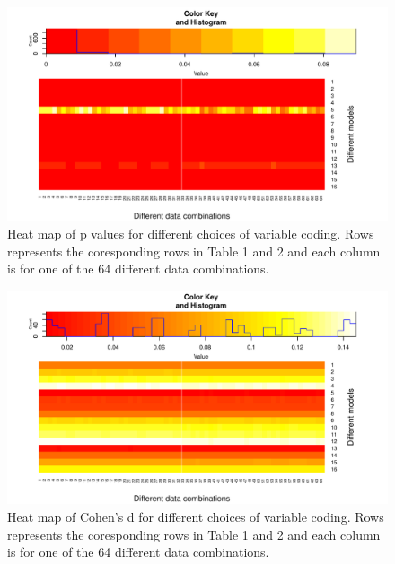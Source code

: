 \documentclass[man]{apa6}
\theoremstyle{definition}
\theoremstyle{definition}
\theoremstyle{definition}
\theoremstyle{remark}
\begin{document}
\begin{figure}
\centering
\includegraphics{stats_6_final_files/figure-latex/heat-p-data-1.pdf}
\caption{\label{fig:heat-p-data}Heat map of p values for different choices
of variable coding. Rows represents the coresponding rows in Table 1 and
2 and each column is for one of the 64 different data combinations.}
\end{figure}

\begin{figure}
\centering
\includegraphics{stats_6_final_files/figure-latex/heat-d-data-1.pdf}
\caption{\label{fig:heat-d-data}Heat map of Cohen's d for different choices
of variable coding. Rows represents the coresponding rows in Table 1 and
2 and each column is for one of the 64 different data combinations.}
\end{figure}
\end{document}
